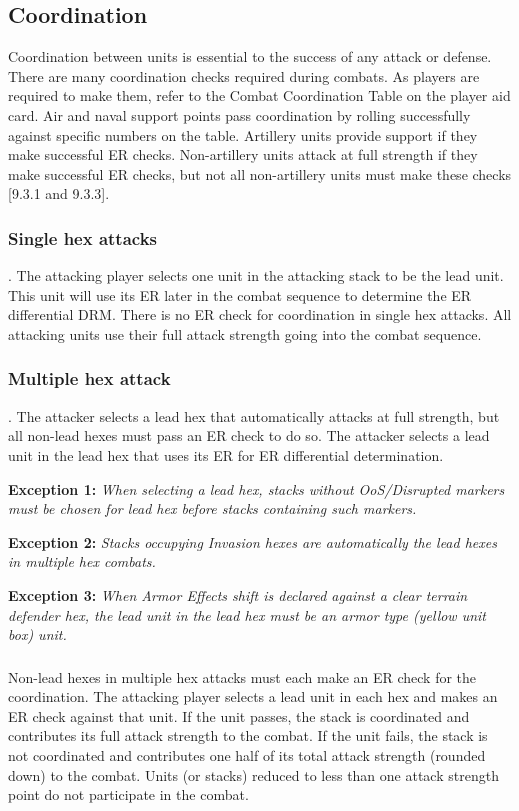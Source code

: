 \subsection{Coordination}
Coordination between units is essential to the success of any attack or defense. There are many coordination checks required during combats. As players are required to make them, refer to the Combat Coordination Table on the player aid card. Air and naval support points pass coordination by rolling successfully against specific numbers on the table. Artillery units provide support if they make successful ER checks. Non-artillery units attack at full strength if they make successful ER checks, but not all non-artillery units must make these checks [9.3.1 and 9.3.3].

\subsubsection{Single hex attacks}.
The attacking player selects one unit in the attacking stack to be the lead unit. This unit will use its ER later in the combat sequence to determine the ER differential DRM. There is no ER check for coordination in single hex attacks. All attacking units use their full attack strength going into the combat sequence.

\subsubsection{Multiple hex attack}.
The attacker selects a lead hex that automatically attacks at full strength, but all non-lead hexes must pass an ER check to do so. The attacker selects a lead unit in the lead hex that uses its ER for ER differential determination.

\textbf{Exception 1:} \textit{When selecting a lead hex, stacks without OoS/Disrupted markers must be chosen for lead hex before stacks containing such markers.}

\textbf{Exception 2:} \textit{Stacks occupying Invasion hexes are automatically the lead hexes in multiple hex combats.}

\textbf{Exception 3:} \textit{When Armor Effects shift is declared against a clear terrain defender hex, the lead unit in the lead hex must be an armor type (yellow unit box) unit.}

\subsubsection{}
Non-lead hexes in multiple hex attacks must each make an ER check for the coordination. The attacking player selects a lead unit in each hex and makes an ER check against that unit. If the unit passes, the stack is coordinated and contributes its full attack strength to the combat. If the unit fails, the stack is not coordinated and contributes one half of its total attack strength (rounded down) to the combat. Units (or stacks) reduced to less than one attack strength point do not participate in the combat.

